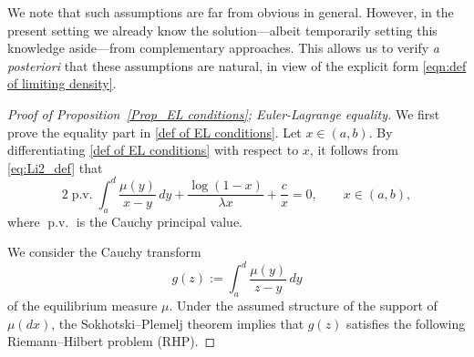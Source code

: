 \documentclass{amsart}
\newcommand{\pv}{\operatorname{p.v.}}
\theoremstyle{plain}
\theoremstyle{remark}
\numberwithin{equation}{section}
\begin{document}
We note that such assumptions are far from obvious in general. However, in the present setting we already know the solution---albeit temporarily setting
this knowledge aside---from complementary approaches. This allows us to
verify \emph{a posteriori} that these assumptions are natural, in view of the
explicit form \eqref{eqn:def of limiting density}.


\begin{proof}[Proof of Proposition~\ref{Prop_EL conditions}; Euler-Lagrange equality]
We first prove the equality part in \eqref{def of EL conditions}. Let $x \in (a,b).$ 
By differentiating \eqref{def of EL conditions} with respect to $x$, it follows from \eqref{eq:Li2_def} that 
\begin{equation}
\label{eq:pv_relation}
    2\pv \int_a^d \frac{\mu(y)}{x-y}\, dy  + \frac{\log(1-x)}{\lambda x} + \frac{c}{x} = 0, \qquad x \in (a,b), 
\end{equation}
where $\pv$ is the Cauchy principal value. 

We consider the Cauchy transform
\begin{equation} \label{def of g Cauchy}
g(z) := \int_a^d \frac{\mu(y)}{z-y}\, dy
\end{equation}
of the equilibrium measure $\mu$. Under the assumed structure of the support of $\mu(dx)$, the Sokhotski--Plemelj theorem implies that $g(z)$ satisfies the following Riemann--Hilbert problem (RHP).



\end{proof}
\end{document}
